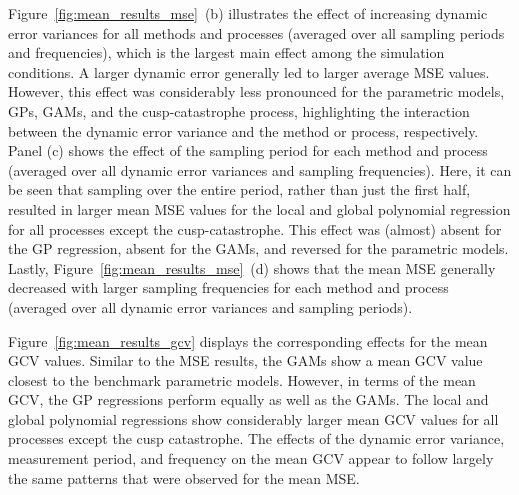 \documentclass[man, floatsintext]{apa7}
\begin{document}
\begin{sidewaysfigure*}[htbp]
  \caption{Mean MSE effects across all processes, analysis
    methods, and simulation conditions}
  \label{fig:mean_results_mse}
\end{sidewaysfigure*}

Figure~\ref{fig:mean_results_mse}~(b) illustrates the effect of increasing
dynamic error variances for all methods and processes (averaged over all
sampling periods and frequencies), which is the largest main effect among the
simulation conditions. A larger dynamic error generally led to larger average
MSE values. However, this effect was considerably less pronounced for the
parametric models, GPs, GAMs, and the cusp-catastrophe process, highlighting
the interaction between the dynamic error variance and the method or process,
respectively. Panel (c) shows the effect of the sampling period for each method
and process (averaged over all dynamic error variances and sampling
frequencies). Here, it can be seen that sampling over the entire period, rather
than just the first half, resulted in larger mean MSE values for the local and
global polynomial regression for all processes except the
cusp-catastrophe. This effect was (almost) absent for the GP regression,
absent for the GAMs, and reversed for the parametric models. Lastly,
Figure~\ref{fig:mean_results_mse}~(d) shows that the mean MSE generally
decreased with larger sampling frequencies for each method and process
(averaged over all dynamic error variances and sampling periods).

Figure~\ref{fig:mean_results_gcv} displays the corresponding effects for the
mean GCV values. Similar to the MSE results, the GAMs show a mean GCV value
closest to the benchmark parametric models. However, in terms of the mean GCV,
the GP regressions perform equally as well as the GAMs. The local and global
polynomial regressions show considerably larger mean GCV values for all
processes except the cusp catastrophe. The effects of the dynamic error
variance, measurement period, and frequency on the mean GCV appear to follow
largely the same patterns that were observed for the mean MSE\@.

\begin{sidewaysfigure*}[htbp]
  \caption{Mean GCV effects across all processes, analysis
    methods, and simulation conditions}
  \label{fig:mean_results_gcv}
\end{sidewaysfigure*}
\end{document}

